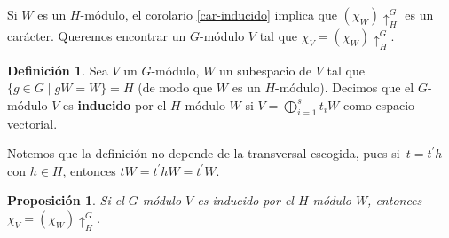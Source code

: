 \documentclass[12pt]{book}
\newtheorem{proposition}[theorem]{Proposición}
\theoremstyle{definition}
\newtheorem{definition}[theorem]{Definición}
\newcounter{in}
\newcounter{ini}
\begin{document}
Si $W$ es un $H$-módulo, el corolario \ref{car-inducido} implica que
$(\chi_{W})\uparrow^{G}_{H}$ es un carácter. Queremos encontrar un
$G$-módulo $V$ tal que $\chi_{V}=(\chi_{W})\uparrow^{G}_{H}$.
\begin{definition}
  Sea $V$ un $G$-módulo, $W$ un subespacio de $V$ tal que $\{g\in
  G\mid gW=W\}=H$ (de modo que $W$ es un $H$-módulo). Decimos que el
  $G$-módulo $V$ es \textbf{inducido} por el $H$-módulo $W$ si
  $V=\bigoplus^{s}_{i=1}t_{i}W$ como espacio vectorial.
\end{definition}
Notemos que la definición no depende de la transversal escogida, pues
si~$t=t^{'}h$ con $h\in H$, entonces $tW=t^{'}hW=t^{'}W$.
\begin{proposition}
  \label{car-ind-W-V}
  Si el $G$-módulo $V$ es inducido por el $H$-módulo $W$, entonces
  $\chi_{V}=(\chi_{W})\uparrow^{G}_{H}$.
\end{proposition}
\end{document}
